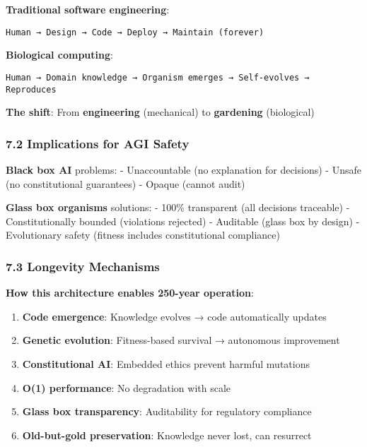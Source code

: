 \documentclass[
]{article}
\providecommand{\tightlist}{%
  \setlength{\itemsep}{0pt}\setlength{\parskip}{0pt}}
\begin{document}
\textbf{Traditional software engineering}:

\begin{verbatim}
Human → Design → Code → Deploy → Maintain (forever)
\end{verbatim}

\textbf{Biological computing}:

\begin{verbatim}
Human → Domain knowledge → Organism emerges → Self-evolves → Reproduces
\end{verbatim}

\textbf{The shift}: From \textbf{engineering} (mechanical) to
\textbf{gardening} (biological)

\subsubsection{7.2 Implications for AGI
Safety}\label{implications-for-agi-safety}

\textbf{Black box AI} problems: - Unaccountable (no explanation for
decisions) - Unsafe (no constitutional guarantees) - Opaque (cannot
audit)

\textbf{Glass box organisms} solutions: - 100\% transparent (all
decisions traceable) - Constitutionally bounded (violations rejected) -
Auditable (glass box by design) - Evolutionary safety (fitness includes
constitutional compliance)

\subsubsection{7.3 Longevity Mechanisms}\label{longevity-mechanisms}

\textbf{How this architecture enables 250-year operation}:

\begin{enumerate}
\def\labelenumi{\arabic{enumi}.}
\tightlist
\item
  \textbf{Code emergence}: Knowledge evolves → code automatically
  updates
\item
  \textbf{Genetic evolution}: Fitness-based survival → autonomous
  improvement
\item
  \textbf{Constitutional AI}: Embedded ethics prevent harmful mutations
\item
  \textbf{O(1) performance}: No degradation with scale
\item
  \textbf{Glass box transparency}: Auditability for regulatory
  compliance
\item
  \textbf{Old-but-gold preservation}: Knowledge never lost, can
  resurrect
\end{enumerate}
\end{document}
